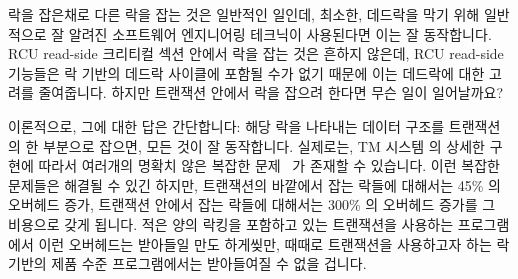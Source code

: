 락을 잡은채로 다른 락을 잡는 것은 일반적인 일인데, 최소한, 데드락을 막기 위해
일반적으로 잘 알려진 소프트웨어 엔지니어링 테크닉이 사용된다면 이는 잘
동작합니다.
RCU read-side 크리티컬 섹션 안에서 락을 잡는 것은 흔하지 않은데, RCU read-side
기능들은 락 기반의 데드락 사이클에 포함될 수가 없기 때문에 이는 데드락에 대한
고려를 줄여줍니다.
하지만 트랜잭션 안에서 락을 잡으려 한다면 무슨 일이 일어날까요?

이론적으로, 그에 대한 답은 간단합니다: 해당 락을 나타내는 데이터 구조를
트랜잭션의 한 부분으로 잡으면, 모든 것이 잘 동작합니다.
실제로는, TM 시스템 의 상세한 구현에 따라서 여러개의 명확치 않은 복잡한
문제~\cite{Volos2008TRANSACT} 가 존재할 수 있습니다.
이런 복잡한 문제들은 해결될 수 있긴 하지만, 트랜잭션의 바깥에서 잡는 락들에
대해서는 45\% 의 오버헤드 증가, 트랜잭션 안에서 잡는 락들에 대해서는 300\% 의
오버헤드 증가를 그 비용으로 갖게 됩니다.
적은 양의 락킹을 포함하고 있는 트랜잭션을 사용하는 프로그램에서 이런 오버헤드는
받아들일 만도 하게씾만, 때때로 트랜잭션을 사용하고자 하는 락 기반의 제품 수준
프로그램에서는 받아들여질 수 없을 겁니다.

